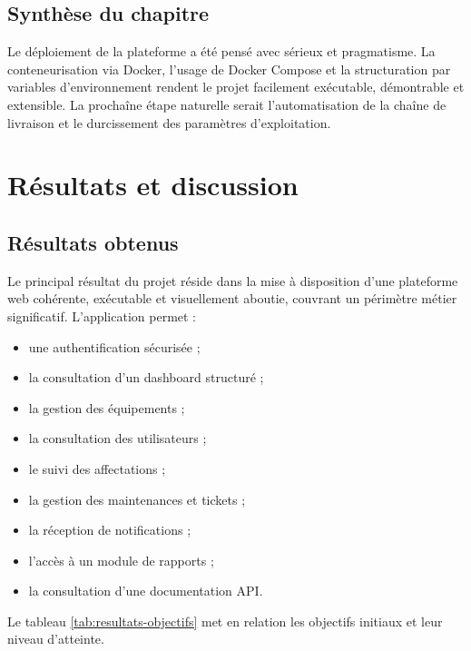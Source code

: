 ﻿\documentclass[12pt,a4paper,oneside]{report}
\begin{document}
\section{Synthèse du chapitre}
Le déploiement de la plateforme a été pensé avec sérieux et pragmatisme. La conteneurisation via Docker, l'usage de Docker Compose et la structuration par variables d'environnement rendent le projet facilement exécutable, démontrable et extensible. La prochaîne étape naturelle serait l'automatisation de la chaîne de livraison et le durcissement des paramètres d'exploitation.









\chapter{Résultats et discussion}
\label{chap:results}

\section{Résultats obtenus}
Le principal résultat du projet réside dans la mise à disposition d'une plateforme web cohérente, exécutable et visuellement aboutie, couvrant un périmètre métier significatif. L'application permet :
\begin{itemize}
  \item une authentification sécurisée ;
  \item la consultation d'un dashboard structuré ;
  \item la gestion des équipements ;
  \item la consultation des utilisateurs ;
  \item le suivi des affectations ;
  \item la gestion des maintenances et tickets ;
  \item la réception de notifications ;
  \item l'accès à un module de rapports ;
  \item la consultation d'une documentation API.
\end{itemize}

Le tableau \ref{tab:resultats-objectifs} met en relation les objectifs initiaux et leur niveau d'atteinte.
\end{document}

